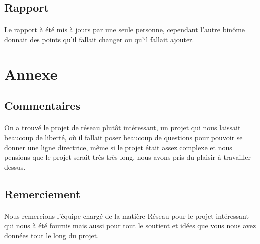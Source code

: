 \documentclass[a4paper,titlepage]{report}
\begin{document}
\subsection{Rapport}
\paragraph{}
Le rapport à été mis à jours par une seule personne, cependant l'autre binôme donnait des points qu'il fallait changer ou qu'il fallait ajouter.


\section{Annexe}
\subsection{Commentaires}
\paragraph{}
On a trouvé le projet de réseau plutôt intéressant, un projet qui nous laissait beaucoup de liberté, où il fallait poser beaucoup de questions pour pouvoir se donner une ligne directrice, même si le projet était assez complexe et nous pensions que le projet serait très très long, nous avons pris du plaisir à travailler dessus.
\subsection{Remerciement}
\paragraph{}
Nous remercions l'équipe chargé de la matière Réseau pour le projet intéressant qui nous à été fournis mais aussi pour tout le soutient et idées que vous nous avez données tout le long du projet.
\end{document}
